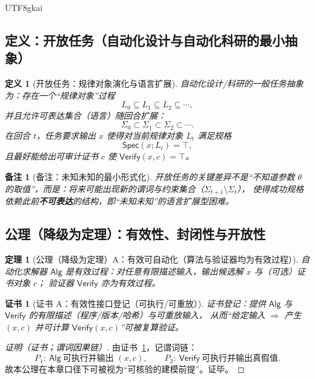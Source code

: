 \documentclass[12pt]{article}
\newtheorem{definition}{定义}[section]
\newtheorem{theorem}{定理}[section]
\newtheorem{remark}{备注}[section]
\newtheorem{Certificate}{证书}[section]
\begin{document}
\begin{CJK*}{UTF8}{gkai}
\subsection{定义：开放任务（自动化设计与自动化科研的最小抽象）}
\label{subsec:tex25-open-task}

\begin{definition}[开放任务：规律对象演化与语言扩展]
自动化设计/科研的一般任务抽象为：存在一个“规律对象”过程
\[
  L_0\subseteq L_1\subseteq L_2\subseteq \cdots,
\]
并且允许可表达集合（语言）随回合扩展：
\[
  \Sigma_0\subset \Sigma_1\subset \Sigma_2\subset \cdots.
\]
在回合 $t$，任务要求输出 $x$ 使得对当前规律对象 $L_t$ 满足规格
\[
  \mathsf{Spec}(x;L_t)=\top,
\]
且最好能给出可审计证书 $c$ 使 $\mathsf{Verify}(x,c)=\top$。
\end{definition}

\begin{remark}[备注：未知未知的最小形式化]
开放任务的关键差异不是“不知道参数 $\theta$ 的取值”，而是：将来可能出现新的谓词与约束集合（$\Sigma_{t+1}\setminus\Sigma_t$），
使得成功规格依赖此前\textbf{不可表达}的结构，即“未知未知”的语言扩展型困难。
\end{remark}

\subsection{公理（降级为定理）：有效性、封闭性与开放性}
\label{subsec:tex25-closed-open-axioms}

\begin{theorem}[公理（降级为定理）A：有效可自动化（算法与验证器均为有效过程）]
\label{thm:tex25-ax-a-effective}
自动化求解器 $\mathsf{Alg}$ 是有效过程：对任意有限描述输入，输出候选解 $x$ 与（可选）证书对象 $c$；
验证器 $\mathsf{Verify}$ 亦为有效过程。
\end{theorem}

\begin{Certificate}[证书 A：有效性接口登记（可执行/可重放）]
\label{cert:tex25-ax-a-effective}
证书登记：提供 $\mathsf{Alg}$ 与 $\mathsf{Verify}$ 的有限描述（程序/版本/哈希）与可重放输入，
从而“给定输入 $\Rightarrow$ 产生 $(x,c)$ 并可计算 $\mathsf{Verify}(x,c)$”可被复算验证。
\end{Certificate}

\begin{proof}[证明（证书；谓词因果链）]
由证书~\ref{cert:tex25-ax-a-effective}，记谓词链：
\[
  P_1:\ \mathsf{Alg}\ \text{可执行并输出 }(x,c),\qquad
  P_2:\ \mathsf{Verify}\ \text{可执行并输出真假值}.
\]
故本公理在本章口径下可被视为“可核验的建模前提”。证毕。
\end{proof}


\end{CJK*}
\end{document}
